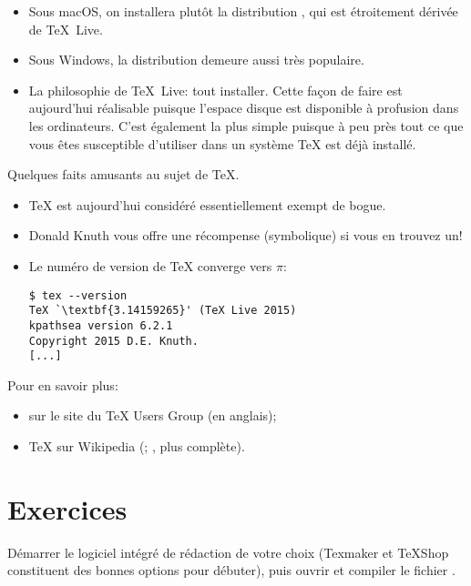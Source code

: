 \begin{itemize}
\item Sous macOS, on installera plutôt la distribution %
  , %
  qui est étroitement dérivée de {\TeX}~Live.
\item Sous Windows, la distribution %
  demeure aussi très populaire.
\item La philosophie de {\TeX}~Live: tout installer. Cette façon de
  faire est aujourd'hui réalisable puisque l'espace disque est
  disponible à profusion dans les ordinateurs. C'est également la plus
  simple puisque à peu près tout ce que vous êtes susceptible
  d'utiliser dans un système {\TeX} est déjà installé.
\end{itemize}


\begin{information}
  Quelques faits amusants au sujet de {\TeX}.
  \begin{itemize}
  \item {\TeX} est aujourd'hui considéré essentiellement exempt de
    bogue.
  \item Donald Knuth vous offre une récompense (symbolique) si vous en
    trouvez un!
  \item Le numéro de version de {\TeX} converge vers $\pi$:
\begin{lstlisting}
$ tex --version
TeX `\textbf{3.14159265}' (TeX Live 2015)
kpathsea version 6.2.1
Copyright 2015 D.E. Knuth.
[...]
\end{lstlisting} %
  \end{itemize}
  Pour en savoir plus:
  \begin{itemize}
  \item {} sur le
    site du {\TeX} Users Group (en anglais);
  \item {\TeX} sur Wikipedia
    (;
    , plus
    complète).
  \end{itemize}
\end{information}



\section{Exercices}
\label{sec:presentation:exercices}

\begin{exercice}[nosol]
  Démarrer le logiciel intégré de rédaction de votre choix (Texmaker
  et TeXShop constituent des bonnes options pour débuter), puis ouvrir
  et compiler le fichier .
\end{exercice}

